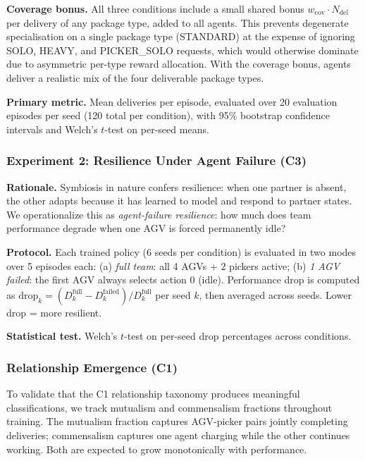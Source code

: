 \documentclass[Afour,sageh,times]{sagej}
\begin{document}
\textbf{Coverage bonus.} All three conditions include a small shared bonus $w_{\mathrm{cov}} \cdot N_{\mathrm{del}}$ per delivery of any package type, added to all agents. This prevents degenerate specialisation on a single package type (STANDARD) at the expense of ignoring SOLO, HEAVY, and PICKER\_SOLO requests, which would otherwise dominate due to asymmetric per-type reward allocation. With the coverage bonus, agents deliver a realistic mix of the four deliverable package types.

\textbf{Primary metric.} Mean deliveries per episode, evaluated over 20 evaluation episodes per seed (120 total per condition), with 95\% bootstrap confidence intervals and Welch's $t$-test on per-seed means.

\subsubsection{Experiment 2: Resilience Under Agent Failure (C3)}

\textbf{Rationale.} Symbiosis in nature confers resilience: when one partner is absent, the other adapts because it has learned to model and respond to partner states. We operationalize this as \emph{agent-failure resilience}: how much does team performance degrade when one AGV is forced permanently idle?

\textbf{Protocol.} Each trained policy (6 seeds per condition) is evaluated in two modes over 5 episodes each: (a) \emph{full team}: all 4 AGVs + 2 pickers active; (b) \emph{1 AGV failed}: the first AGV always selects action 0 (idle). Performance drop is computed as $\mathrm{drop}_k = (D_k^{\mathrm{full}} - D_k^{\mathrm{failed}}) / D_k^{\mathrm{full}}$ per seed $k$, then averaged across seeds. Lower drop = more resilient.

\textbf{Statistical test.} Welch's $t$-test on per-seed drop percentages across conditions.

\subsubsection{Relationship Emergence (C1)}

To validate that the C1 relationship taxonomy produces meaningful classifications, we track mutualism and commensalism fractions throughout training. The mutualism fraction captures AGV-picker pairs jointly completing deliveries; commensalism captures one agent charging while the other continues working. Both are expected to grow monotonically with performance.
\end{document}
